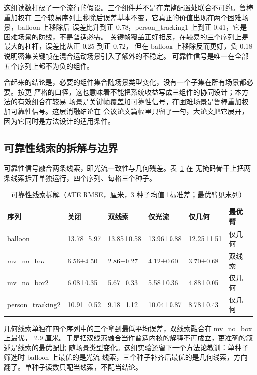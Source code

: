 这组读数打破了一个流行的假设。三个组件并不是在完整配置处联合不可约。鲁棒重加权在
三个较易序列上移除后误差基本不变，它真正的价值出现在两个困难场景，balloon 上移除后
误差比升到正 0.78，person\_tracking1 上到正 0.41，它是困难场景的防线，不是普适必需。
关键帧覆盖正好相反，在较易的三个序列上是最大的杠杆，误差比从正 0.25 到正 0.72，
但在 balloon 上移除反而更好，负 0.18 说明密集关键帧在混合运动场景引入了额外的不稳定。
可靠性信号是唯一在全部五个序列上都不为负的组件。

合起来的结论是，必要的组件集合随场景类型变化，没有一个子集在所有场景都必要。按更
严格的口径，这也意味着不能把系统收益写成三组件的协同设计；本方法的有效组合在较易
场景是关键帧覆盖加可靠性信号，在困难场景是鲁棒重加权加可靠性信号。这层消融结论在
会议论文篇幅里只留了一句，大论文把它展开，因为它同时是方法设计的适用条件。

\subsection{可靠性线索的拆解与边界}

可靠性信号融合两条线索，即光流一致性与几何残差。表~\ref{tab:study1-cuesplit} 在
无掩码骨干上把两条线索拆开单独运行，四个序列、每格三个种子。

\begin{table}[htbp]
\centering
\small
\caption{可靠性线索拆解（ATE RMSE，厘米，3 种子均值±标准差；最优臂见末列）}
\label{tab:study1-cuesplit}
\begin{tabular}{llllll}
\toprule
序列 & 关闭 & 双线索 & 仅光流 & 仅几何 & 最优臂 \\
\midrule
balloon & 13.78±5.97 & 13.85±0.58 & 13.96±0.88 & 12.25±1.51 & 仅几何 \\
mv\_no\_box & 6.56±4.50 & 2.86±0.27 & 4.12±0.60 & 3.70±0.68 & 双线索 \\
mv\_no\_box2 & 6.08±0.35 & 5.67±0.33 & 5.58±0.36 & 4.88±0.05 & 仅几何 \\
person\_tracking2 & 10.91±0.52 & 9.18±1.12 & 10.04±0.87 & 8.78±0.43 & 仅几何 \\
\bottomrule
\end{tabular}
\end{table}

几何线索单独在四个序列中的三个拿到最低平均误差，双线索融合在 mv\_no\_box 上最优，
2.9 厘米。于是把双线索融合当作普适内核的解释不再成立，更准确的叙述是线索的最优配比
随场景类型变化。这组实验还留下一个方法论教训：单种子筛选时 balloon 上最优的是光流
线索，三个种子补齐后最优的是几何线索，方向翻了。单种子读数只配当线索，不配当结论。

